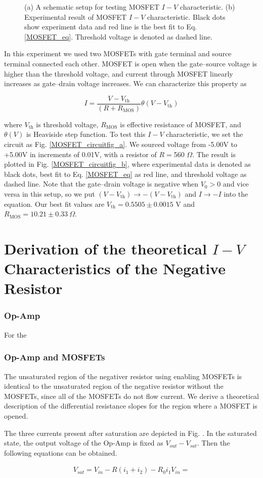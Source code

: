 \documentclass[%
 aip,
amsmath,amssymb,
reprint,
]{revtex4-1}
\begin{document}
\begin{figure}[!htbp]
\caption{(a) A schematic setup for testing MOSFET $I-V$ characteristic. (b) Experimental result of MOSFET $I-V$ characteristic. Black dots show experiment data and red line is the best fit to Eq. \ref{MOSFET_eq}. Threshold voltage is denoted as dashed line.} \label{MOSFET_circuitfig}
\end{figure}

In this experiment we used two MOSFETs with gate terminal and source terminal connected each other.
MOSFET is open when the gate--source voltage is higher than the threshold voltage, and current through MOSFET linearly increases as gate--drain voltage increases.
We can characterize this property as 

\begin{equation}
I=\frac{V-V_{\textrm{th}}}{(R+R_{\textrm{MOS}})}\theta(V-V_{\textrm{th}})
\label{MOSFET_eq}
\end{equation}

\noindent where $V_{\textrm{th}}$ is threshold voltage, $R_{\textrm{MOS}}$ is effective resistance of MOSFET, and $\theta(V)$ is Heaviside step function.
To test this $I-V$ characteristic, we set the circuit as Fig. \ref{MOSFET_circuitfig_a}.
We sourced voltage from -5.00V to +5.00V in increments of 0.01V, with a resistor of $R=$560 $\Omega$.
The result is plotted in Fig. \ref{MOSFET_circuitfig_b}, where experimental data is denoted as black dots, best fit to Eq. \ref{MOSFET_eq} as red line, and threshold voltage as dashed line.
Note that the gate--drain voltage is negative when $V_{0}>0$ and vice versa in this setup, so we put $(V-V_{\textrm{th}})\rightarrow-(V-V_{\textrm{th}})$ and $I\rightarrow -I$ into the equation.
Our best fit values are $V_{\textrm{th}}=0.5505\pm0.0015$ V and $R_{\textrm{MOS}}=10.21\pm0.33\>\Omega$.


\section{Derivation of the theoretical $I-V$ Characteristics of the Negative Resistor}
\subsubsection{\label{opampiv}Op-Amp}
For the 

\subsubsection{\label{opamp_mosfetiv}Op-Amp and MOSFETs}
The unsaturated region of the negativer resistor using enabling MOSFETs is identical to the unsaturated region of the negative resistor without the MOSFETs, since all of the MOSFETs do not flow current. We derive a theoretical description of the differential resistance slopes for the region where a MOSFET is opened. 

The three currents present after saturation are depicted in Fig. . In the saturated state, the output voltage of the Op-Amp is fixed as $V_{out}-V_{sat}$. Then the following equations can be obtained.

\begin{eqnarray*}
  V_{sat} = V_{in} - R(i_1+i_2)-R_0i_1
  V_{in} = 
\end{eqnarray*}
\end{document}
